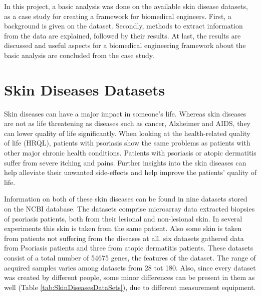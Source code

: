 \documentclass[10pt,a4paper]{article}
\begin{document}
	In this project, a basic analysis was done on the available skin disease datasets, as a case study for creating a framework for biomedical engineers. First, a background is given on the dataset. Secondly, methods to extract information from the data are explained, followed by their results. At last, the results are discussed and useful aspects for a biomedical engineering framework about the basic analysis are concluded from the case study.
	
	
	\section{Skin Diseases Datasets}
	\label{sec:SkinDiseasesDataSet}
	
	Skin diseases can have a major impact in someone's life. Whereas skin diseases are not as life threatening as diseases such as cancer, Alzheimer and AIDS, they can lower quality of life significantly. When looking at the health-related quality of life (HRQL), patients with psoriasis show the same problems as patients with other major chronic health conditions\cite{rapp1999psoriasis}. Patients with psoriasis or atopic dermatitis suffer from severe itching and pains. Further insights into the skin diseases can help alleviate their unwanted side-effects and help improve the patients' quality of life\cite{jowett1985skin}.
	
	Information on both of these skin diseases can be found in nine datasets stored on the NCBI database\cite{edgar2002gene}. The datasets comprise microarray data extracted biopsies of psoriasis patients, both from their lesional and non-lesional skin. In several experiments this skin is taken from the same patient. Also some skin is taken from patients not suffering from the diseases at all. six datasets gathered data from Psoriasis patients and three from atopic dermatitis patients. These datasets consist of a total number of 54675 genes, the features of the dataset. The range of acquired samples varies among datasets from 28 tot 180. Also, since every dataset was created by different people, some minor differences can be present in them as well (Table \ref{tab:SkinDiseasesDataSets}), due to different measurement equipment.
	
\end{document}
